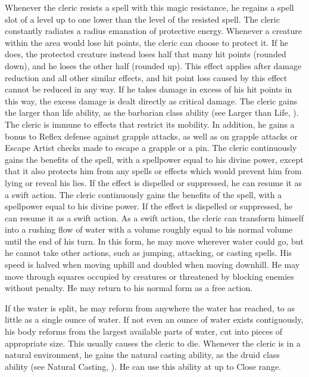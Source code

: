             Whenever the cleric resists a spell with this magic resistance, he regains a spell slot of a level up to one lower than the level of the resisted spell.
            The cleric constantly radiates a \areamed radius emanation of protective energy.
            Whenever a creature within the area would lose hit points, the cleric can choose to protect it.
            If he does, the protected creature instead loses half that many hit points (rounded down), and he loses the other half (rounded up).
            This effect applies after damage reduction and all other similar effects, and hit point loss caused by this effect cannot be reduced in any way.
            If he takes damage in excess of his hit points in this way, the excess damage is dealt directly as critical damage.
            The cleric gains the larger than life ability, as the barbarian class ability (see Larger than Life, ).
            The cleric is immune to effects that restrict its mobility. In addition, he gains a  bonus to Reflex defense against grapple attacks, as well as on grapple attacks or Escape Artist checks made to escape a grapple or a pin.
             The cleric continuously gains the benefits of the 
            spell, with a spellpower equal to his divine power, except that it also protects him from any spells or effects which would prevent him from lying or reveal his lies.
            If the effect is dispelled or suppressed, he can resume it as a swift action.
             The cleric continuously gains the benefits of the 
            spell, with a spellpower equal to his divine power.
            If the effect is dispelled or suppressed, he can resume it as a swift action.
            As a swift action, the cleric can transform himself into a rushing flow of water with a volume roughly equal to his normal volume until the end of his turn.
            In this form, he may move wherever water could go, but he cannot take other actions, such as jumping, attacking, or casting spells.
            His speed is halved when moving uphill and doubled when moving downhill.
            He may move through squares occupied by creatures or threatened by blocking enemies without penalty.
            He may return to his normal form as a free action.
            \par If the water is split, he may reform from anywhere the water has reached, to as little as a single ounce of water.
            If not even an ounce of water exists contiguously, his body reforms from the largest available parts of water, cut into pieces of appropriate size.
            This usually causes the cleric to die.
            Whenever the cleric is in a natural environment, he gains the natural casting ability, as the druid class ability (see Natural Casting, ).
            He can use this ability at up to Close range.

